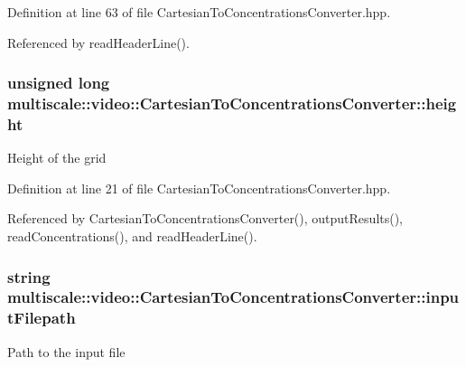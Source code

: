 \-Definition at line 63 of file \-Cartesian\-To\-Concentrations\-Converter.\-hpp.



\-Referenced by read\-Header\-Line().

\hypertarget{classmultiscale_1_1video_1_1CartesianToConcentrationsConverter_a94e58072f2e143bd6476133370ffb37f}{
\subsubsection[{height}]{\setlength{\rightskip}{0pt plus 5cm}unsigned long {\bf multiscale\-::video\-::\-Cartesian\-To\-Concentrations\-Converter\-::height}}}\label{classmultiscale_1_1video_1_1CartesianToConcentrationsConverter_a94e58072f2e143bd6476133370ffb37f}
\-Height of the grid 

\-Definition at line 21 of file \-Cartesian\-To\-Concentrations\-Converter.\-hpp.



\-Referenced by \-Cartesian\-To\-Concentrations\-Converter(), output\-Results(), read\-Concentrations(), and read\-Header\-Line().

\hypertarget{classmultiscale_1_1video_1_1CartesianToConcentrationsConverter_affebbc7e1c67692bd529f19fc0451e58}{
\subsubsection[{input\-Filepath}]{\setlength{\rightskip}{0pt plus 5cm}string {\bf multiscale\-::video\-::\-Cartesian\-To\-Concentrations\-Converter\-::input\-Filepath}}}\label{classmultiscale_1_1video_1_1CartesianToConcentrationsConverter_affebbc7e1c67692bd529f19fc0451e58}
\-Path to the input file 

